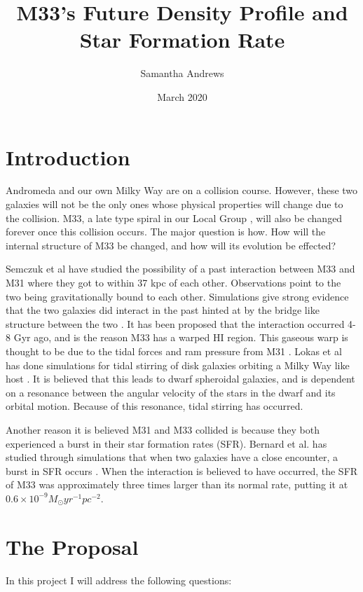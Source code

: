\documentclass[10pt]{extarticle}
\title{M33's Future Density Profile and Star Formation Rate}
\author{Samantha Andrews}
\date{March 2020}
\begin{document}
\maketitle

\section{Introduction}
Andromeda and our own Milky Way are on a collision course. However, these two galaxies will not be the only ones whose physical properties will change due to the collision. M33, a late type spiral in our Local Group \cite{2018ApJ...864...34S}, will also be changed forever once this collision occurs. The major question is how. How will the internal structure of M33 be changed, and how will its evolution be effected? 

Semczuk et al have studied the possibility of a past interaction between M33 and M31 where they got to within 37  kpc of each other. Observations point to the two being gravitationally bound to each other. Simulations give strong evidence that the two galaxies did interact in the past hinted at by the bridge like structure between the two \cite{10.1111/j.1745-3933.2008.00528.x}. It has been proposed that the interaction occurred 4-8 Gyr ago, and is the reason M33 has a warped HI region. This gaseous warp is thought to be due to the tidal forces and ram pressure from M31 \cite{2018ApJ...864...34S}. Lokas et al has done simulations for tidal stirring of disk galaxies orbiting a Milky Way like host \cite{_okas_2015}. It is believed that this leads to dwarf spheroidal galaxies, and is dependent on a resonance between the angular velocity
of the stars in the dwarf and its orbital motion. Because of this resonance, tidal stirring has occurred. 

Another reason it is believed M31 and M33 collided is because they both experienced a burst in their star formation rates (SFR). Bernard et al. has studied through simulations that when two galaxies have a close encounter, a burst in SFR occurs \cite{10.1111/j.1365-2966.2011.20234.x}. When the interaction is believed to have occurred, the SFR of M33 was approximately three times larger than its normal rate, putting it at $0.6 \times 10^{-9} M_{\odot} yr^{-1} pc^{-2} $.

\section{The Proposal}
In this project I will address the following questions:
\end{document}
